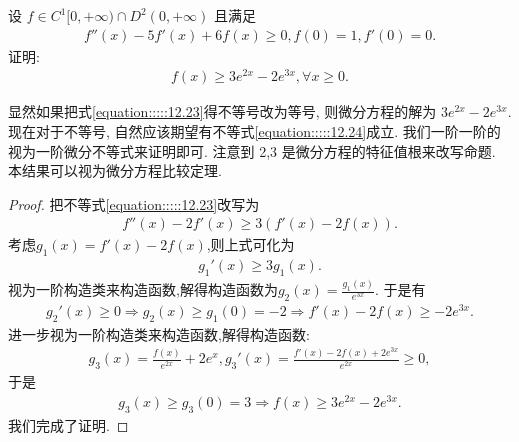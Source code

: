 \documentclass[../../main.tex]{subfiles}
\begin{document}
\begin{example}
设 $f\in C^1[0,+\infty)\cap D^2(0,+\infty)$ 且满足
\begin{align}
f''(x)-5f'(x)+6f(x)\geqslant0,f(0)=1,f'(0)=0.
\label{equation:::::12.23}
\end{align}
证明:
\begin{align}
f(x)\geqslant3e^{2x}-2e^{3x},\forall x\geqslant0.
\label{equation:::::12.24}
\end{align}
\end{example}
\begin{note}
显然如果把式\eqref{equation:::::12.23}得不等号改为等号, 则微分方程的解为 $3e^{2x}-2e^{3x}$. 现在对于不等号, 自然应该期望有不等式\eqref{equation:::::12.24}成立. 我们一阶一阶的视为一阶微分不等式来证明即可. 注意到 2,3 是微分方程的特征值根来改写命题. 本结果可以视为微分方程比较定理.
\end{note}
\begin{proof}
把不等式\eqref{equation:::::12.23}改写为
\begin{align*}
f''(x)-2f'(x)\geqslant3(f'(x)-2f(x)).
\end{align*}
考虑$g_1(x)=f'(x)-2f(x)$,则上式可化为
\begin{align*}
g_1'(x)\geqslant 3g_1(x).
\end{align*}
视为一阶构造类来构造函数,解得构造函数为$g_2(x)=\frac{g_1(x)}{e^{3x}}$.
于是有
\begin{align*}
g_2'(x)\geqslant0\Rightarrow g_2(x)\geqslant g_1(0)=-2\Rightarrow f'(x)-2f(x)\geqslant -2e^{3x}.
\end{align*}
进一步视为一阶构造类来构造函数,解得构造函数:
\begin{align*}
g_3(x)=\frac{f(x)}{e^{2x}}+2e^{x},g_3'(x)=\frac{f'(x)-2f(x)+2e^{3x}}{e^{2x}}\geqslant0,
\end{align*}
于是
\begin{align*}
g_3(x)\geqslant g_3(0)=3\Rightarrow f(x)\geqslant3e^{2x}-2e^{3x}.
\end{align*}
我们完成了证明. 

\end{proof}
\end{document}
